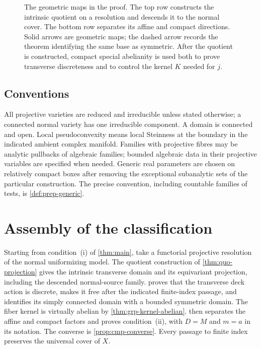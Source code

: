 \documentclass[11pt,a4paper]{amsart}
\begin{document}
\begin{figure}[htbp]
\centering

\caption{The geometric maps in the proof. The top row constructs the
intrinsic quotient on a resolution and descends it to the normal
cover. The bottom row separates its affine and compact directions.
Solid arrows are geometric maps; the dashed arrow records the
theorem identifying the same base as symmetric. After the quotient
is constructed, compact special abelianity is used both to prove
transverse discreteness and to control the kernel $K$ needed for $j$.}
\label{fig:classification}
\end{figure}

\subsection{Conventions}
All projective varieties are reduced and irreducible unless stated otherwise; a connected normal variety has one irreducible component. A domain is connected and open. Local pseudoconvexity means local Steinness at the boundary in the indicated ambient complex manifold. Families with projective fibres may be analytic pullbacks of algebraic families; bounded algebraic data in their projective variables are specified when needed. Generic real parameters are chosen on relatively compact boxes after removing the exceptional subanalytic sets of the particular construction. The precise convention, including countable families of tests, is \cref{def:prep-generic}.

\tableofcontents








\section{Assembly of the classification}\label{sec:assembly}
Starting from condition~\textup{(i)} of \cref{thm:main}, take a functorial projective resolution of the normal uniformizing model. The quotient construction of \cref{thm:quo-projection} gives the intrinsic transverse domain and its equivariant projection, including the descended normal-source family.  proves that the transverse deck action is discrete, makes it free after the indicated finite-index passage, and identifies its simply connected domain with a bounded symmetric domain. The fiber kernel is virtually abelian by \cref{thm:grp-kernel-abelian}.  then separates the affine and compact factors and proves condition~\textup{(ii)}, with $D=M$ and $m=a$ in its notation. The converse is \cref{prop:cmp-converse}. Every passage to finite index preserves the universal cover of $X$.
\end{document}
